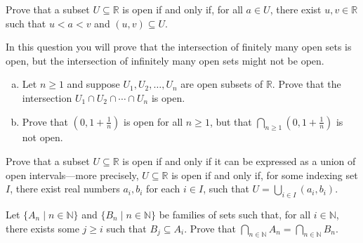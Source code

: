 \begin{chapex}
Prove that a subset $U \subseteq \mathbb{R}$ is open if and only if, for all $a \in U$, there exist $u,v \in \mathbb{R}$ such that $u<a<v$ and $(u,v) \subseteq U$.
\end{chapex}

\begin{chapex}
In this question you will prove that the intersection of finitely many open sets is open, but the intersection of infinitely many open sets might not be open.
\begin{enumerate}[(a)]
\item Let $n \ge 1$ and suppose $U_1, U_2, \dots, U_n$ are open subsets of $\mathbb{R}$. Prove that the intersection $U_1 \cap U_2 \cap \cdots \cap U_n$ is open.
\item Prove that $(0,1+\frac{1}{n})$ is open for all $n \ge 1$, but that $\bigcap_{n \ge 1} (0,1+\textstyle\frac{1}{n})$ is not open.
\end{enumerate}
\end{chapex}

\begin{chapex}
\label{cqOpenSubsetsOfREnd}
Prove that a subset $U \subseteq \mathbb{R}$ is open if and only if it can be expressed as a union of open intervals---more precisely, $U \subseteq \mathbb{R}$ is open if and only if, for some indexing set $I$, there exist real numbers $a_i, b_i$ for each $i \in I$, such that $U = \bigcup_{i \in I} (a_i, b_i)$.
\end{chapex}

\begin{chapex}
Let $\{ A_n \mid n \in \mathbb{N} \}$ and $\{ B_n \mid n \in \mathbb{N} \}$ be families of sets such that, for all $i \in \mathbb{N}$, there exists some $j \ge i$ such that $B_j \subseteq A_i$. Prove that $\bigcap_{n \in \mathbb{N}} A_n = \bigcap_{n \in \mathbb{N}} B_n$.
\end{chapex}


